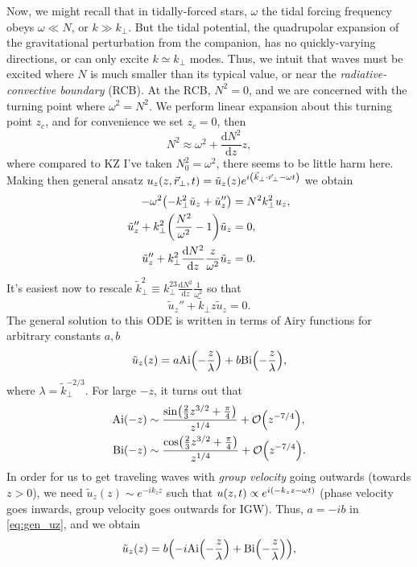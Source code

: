 \documentclass[11pt,
        usenames, %
        dvipsnames %
    ]{article}
\newcommand*{\rd}[2]{\frac{\mathrm{d}#1}{\mathrm{d}#2}}
\DeclarePairedDelimiter\p{\lparen}{\rparen}
\begin{document}
Now, we might recall that in tidally-forced stars, $\omega$ the tidal forcing
frequency obeys $\omega \ll N$, or $k \gg k_\perp$. But the tidal potential, the
quadrupolar expansion of the gravitational perturbation from the companion, has
no quickly-varying directions, or can only excite $k \simeq k_\perp$ modes.
Thus, we intuit that waves must be excited where $N$ is much smaller than its
typical value, or near the \emph{radiative-convective boundary} (RCB). At the
RCB, $N^2 = 0$, and we are concerned with the turning point where $\omega^2 =
N^2$. We perform linear expansion about this turning point $z_c$, and for
convenience we set $z_c = 0$, then
\begin{equation}
    N^2 \approx \omega^2 + \rd{N^2}{z}z,
\end{equation}
where compared to KZ I've taken $N_0^2 = \omega^2$, there seems to be little
harm here. Making then general ansatz $u_z(z, \vec{r}_\perp, t) = \tilde{u}_z(z)
e^{i\p*{\vec{k}_{\perp} \cdot \vec{r}_{\perp} - \omega t}}$ we obtain
\begin{align}
    -\omega^2 \p*{-k_\perp^2 \tilde{u}_z + \tilde{u}_z''}
            &= N^2k_\perp^2 u_z,\\
        \tilde{u}_z'' + k_\perp^2\p*{\frac{N^2}{\omega^2} - 1}\tilde{u}_z &= 0
            ,\\
        \tilde{u}_z'' + k_\perp^2\rd{N^2}{z}\frac{z}{\omega^2}\tilde{u}_z &= 0.
\end{align}
It's easiest now to rescale $\tilde{k}_\perp^2 \equiv k_\perp^23
\rd{N^2}{z}\frac{1}{\omega^2}$ so that
\begin{equation}
    \tilde{u}_z'' + \tilde{k}_\perp z\tilde{u}_z = 0.
\end{equation}
The general solution to this ODE is written in terms of Airy functions for
arbitrary constants $a, b$
\begin{equation}
    \tilde{u}_z(z) = a\mathrm{Ai}\p*{-\frac{z}{\lambda}}
        + b\mathrm{Bi}\p*{-\frac{z}{\lambda}},\label{eq:gen_uz}
\end{equation}
where $\lambda = \tilde{k}_\perp^{-2/3}$. For large $-z$, it turns out that
\begin{align}
    \mathrm{Ai}\p*{-z} &\sim \frac{\sin\p*{\frac{2}{3}z^{3/2} +
        \frac{\pi}{4}}}{z^{1/4}} + \mathcal{O}\p*{z^{-7/4}},\\
    \mathrm{Bi}\p*{-z} &\sim \frac{\cos\p*{\frac{2}{3}z^{3/2} +
        \frac{\pi}{4}}}{z^{1/4}} + \mathcal{O}\p*{z^{-7/4}}.
\end{align}
In order for us to get traveling waves with \emph{group velocity} going outwards
(towards $z > 0$), we need $\tilde{u}_z(z) \sim e^{-ik_zz}$ such that $u(z, t)
\propto e^{i\p*{-k_zz - \omega t}}$ (phase velocity goes inwards, group velocity
goes outwards for IGW). Thus, $a = -ib$ in \autoref{eq:gen_uz}, and we obtain
\begin{equation}
    \tilde{u}_z(z) = b\p*{-i\mathrm{Ai}\p*{-\frac{z}{\lambda}}
        + \mathrm{Bi}\p*{-\frac{z}{\lambda}}},\label{eq:gen_uz}
\end{equation}
\end{document}
